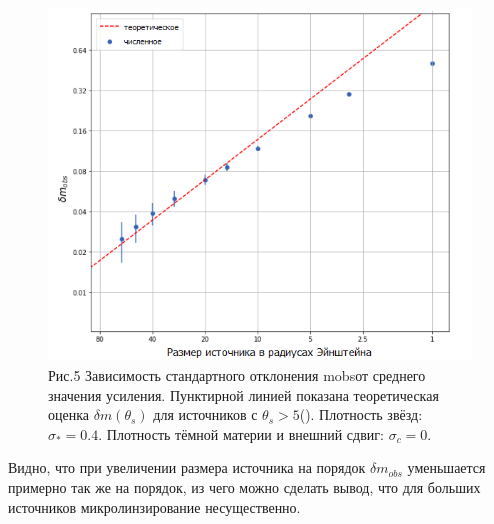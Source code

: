 \begin{figure}[H]
    \centering
	\includegraphics[scale=0.69]{pics/size_np_std.png}
	\caption{ Рис.5 Зависимость стандартного отклонения mobsот среднего значения усиления. Пунктирной линией показана теоретическая оценка $\delta m (\theta_s)$ для источников с $\theta_s > 5$(\cite{refsdalstabell1991}). Плотность звёзд: $\sigma_*=0.4$. Плотность тёмной материи и внешний сдвиг: $\sigma_c=0$. \label{fig:refstab} } 
\end{figure}
Видно, что при увеличении размера источника на порядок $\delta m_{obs}$ уменьшается примерно так же на порядок, из чего можно сделать вывод, что для больших источников микролинзирование несущественно.